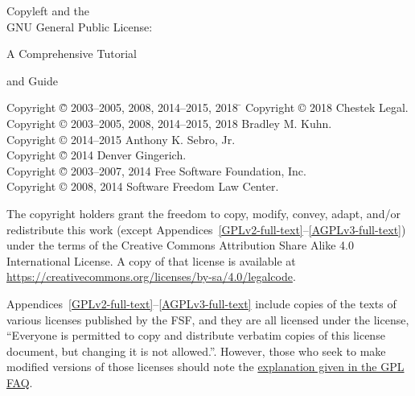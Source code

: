 \documentclass[10pt, letterpaper, openany, oneside]{book}
\begin{document}
\pagestyle{plain}

\frontmatter

\begin{titlepage}

\begin{center}

{\Huge
{\sc Copyleft and the  \\

GNU General Public License:

\vspace{.25in}

A Comprehensive Tutorial \\

\vspace{.1in}

and Guide
}}
\vfill

{\parindent 0in
\begin{tabbing}
Copyright \= \copyright{} 2003--2005, 2008, 2014--2015, 2018 \hspace{1.mm} \=  \kill
Copyright \> \copyright{} 2018 \>  Chestek Legal. \\
Copyright \> \copyright{} 2003--2005, 2008, 2014--2015, 2018 \>  Bradley M. Kuhn. \\
Copyright \> \copyright{} 2014--2015 \>  Anthony K. Sebro, Jr. \\
Copyright \= \copyright{} 2014 \> Denver Gingerich. \\
Copyright \= \copyright{} 2003--2007, 2014 \>  Free Software Foundation, Inc. \\
Copyright \> \copyright{} 2008, 2014 \>  Software Freedom Law Center. \\
\end{tabbing}

\vspace{.3in}

The copyright holders grant the freedom to copy, modify, convey,
adapt, and/or redistribute this work (except
Appendices~\ref{GPLv2-full-text}--\ref{AGPLv3-full-text}) under the terms of the Creative Commons
Attribution Share Alike 4.0 International License.  A copy of that license is
available at \url{https://creativecommons.org/licenses/by-sa/4.0/legalcode}.

Appendices~\ref{GPLv2-full-text}--\ref{AGPLv3-full-text} include copies of the texts of various licenses published
by the FSF, and they are all licensed under the license, ``Everyone is permitted
to copy and distribute verbatim copies of this license document, but changing
it is not allowed.''.  However, those who seek to make modified versions of
those licenses should note the
\href{https://www.gnu.org/licenses/gpl-faq.html#ModifyGPL}{explanation given in the GPL FAQ}.

}
\end{center}
\end{titlepage}
\end{document}

